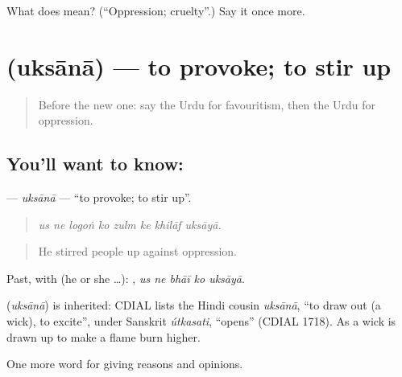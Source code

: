 \begin{tcolorbox}[breakable,colback=teal!4,colframe=teal!35!black,title={Before you move on}]
What does  mean? (\textquotedblleft{}Oppression; cruelty\textquotedblright{}.) Say it once more.
\end{tcolorbox}
\section[\texorpdfstring{\ur{اکسانا} (uksānā)}{اکسانا (uksānā)}]{ (uksānā) — to provoke; to stir up}

\label{lesson:UR-C344-uksana}



\begin{quote}
Before the new one: say the Urdu for favouritism, then the Urdu for oppression.
\end{quote}

\subsection*{You'll want to know: }
\textbf{} — \emph{uksānā} — \textquotedblleft{}to provoke; to stir up\textquotedblright{}.

\begin{quote}
       
\end{quote}

\begin{quote}
\emph{us ne logoṅ ko zulm ke khilāf uksāyā.}
\end{quote}

\begin{quote}
He stirred people up against oppression.
\end{quote}

Past, with  (he or she …):     , \emph{us ne bhāī ko uksāyā}.

\begin{cousinweb}
\textbf{} (\emph{uksānā}) is inherited: CDIAL lists the Hindi cousin \emph{uksānā}, \textquotedblleft{}to draw out (a wick), to excite\textquotedblright{}, under Sanskrit \emph{útkasati}, \textquotedblleft{}opens\textquotedblright{} (CDIAL 1718). As a wick is drawn up to make a flame burn higher.
\end{cousinweb}

\begin{grammarlens}[title={What you've built}]
One more word for giving reasons and opinions.
\end{grammarlens}

